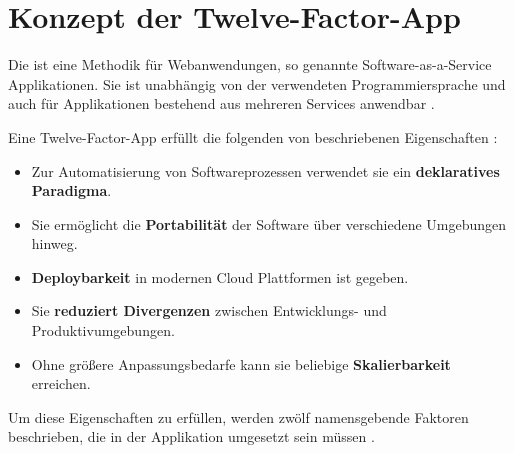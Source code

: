 \section{Konzept der Twelve-Factor-App}
\label{sec:03-05_concept-of-twelve-factor-app}

Die  ist eine Methodik für Webanwendungen, so genannte Software-as-a-Service Applikationen. Sie ist unabhängig von der verwendeten Programmiersprache und auch für Applikationen bestehend aus mehreren Services anwendbar \cite{101:The-Twelve-Factor-App}.

Eine Twelve-Factor-App erfüllt die folgenden von \citeauthor{103:Creating-Cloud-native-applications-12-Factor-Applications} beschriebenen Eigenschaften \cite{103:Creating-Cloud-native-applications-12-Factor-Applications}:

\begin{itemize}
    \item Zur Automatisierung von Softwareprozessen verwendet sie ein \textbf{deklaratives Paradigma}.
    \item Sie ermöglicht die \textbf{Portabilität} der Software über verschiedene Umgebungen hinweg.
    \item \textbf{Deploybarkeit} in modernen Cloud Plattformen ist gegeben.
    \item Sie \textbf{reduziert Divergenzen} zwischen Entwicklungs- und Produktivumgebungen.
    \item Ohne größere Anpassungsbedarfe kann sie beliebige \textbf{Skalierbarkeit} erreichen.
\end{itemize}

Um diese Eigenschaften zu erfüllen, werden zwölf namensgebende Faktoren beschrieben, die in der Applikation umgesetzt sein müssen \cite{101:The-Twelve-Factor-App,102:Twelve-Factor-App-Revisited}.

